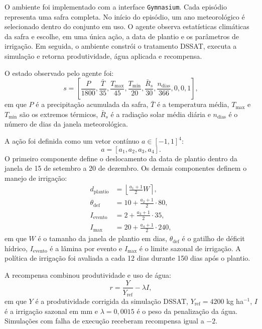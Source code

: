 O ambiente foi implementado com a interface \texttt{Gymnasium}. Cada episódio
representa uma safra completa. No início do episódio, um ano meteorológico é
selecionado dentro do conjunto em uso. O agente observa estatísticas climáticas
da safra e escolhe, em uma única ação, a data de plantio e os parâmetros de
irrigação. Em seguida, o ambiente constrói o tratamento DSSAT, executa a
simulação e retorna produtividade, água aplicada e recompensa.

O estado observado pelo agente foi:
\begin{equation}
    s =
    \left[
    \frac{P}{1800},
    \frac{\bar{T}}{35},
    \frac{T_{\max}}{45},
    \frac{T_{\min}}{20},
    \frac{\bar{R}_{s}}{30},
    \frac{n_{\mathrm{dias}}}{366},
    0,
    0,
    1
    \right],
\end{equation}
em que $P$ é a precipitação acumulada da safra, $\bar{T}$ é a temperatura média,
$T_{\max}$ e $T_{\min}$ são os extremos térmicos, $\bar{R}_{s}$ é a radiação
solar média diária e $n_{\mathrm{dias}}$ é o número de dias da janela
meteorológica.

A ação foi definida como um vetor contínuo $a \in [-1,1]^4$:
\begin{equation}
    a = [a_1, a_2, a_3, a_4].
\end{equation}
O primeiro componente define o deslocamento da data de plantio dentro da janela
de 15 de setembro a 20 de dezembro. Os demais componentes definem o manejo de
irrigação:
\begin{align}
    d_{\mathrm{plantio}} &=
    \left\lfloor
    \frac{a_1 + 1}{2} W
    \right\rceil, \\
    \theta_{\mathrm{def}} &=
    10 + \frac{a_2 + 1}{2}\cdot 80, \\
    I_{\mathrm{evento}} &=
    2 + \frac{a_3 + 1}{2}\cdot 35, \\
    I_{\mathrm{max}} &=
    20 + \frac{a_4 + 1}{2}\cdot 240,
\end{align}
em que $W$ é o tamanho da janela de plantio em dias,
$\theta_{\mathrm{def}}$ é o gatilho de déficit hídrico, $I_{\mathrm{evento}}$ é a
lâmina por evento e $I_{\mathrm{max}}$ é o limite sazonal de irrigação. A
política de irrigação foi avaliada a cada 12 dias durante 150 dias após o
plantio.

A recompensa combinou produtividade e uso de água:
\begin{equation}
    r =
    \frac{Y}{Y_{\mathrm{ref}}}
    -
    \lambda I,
\end{equation}
em que $Y$ é a produtividade corrigida da simulação DSSAT, $Y_{\mathrm{ref}} =
4200$ kg ha$^{-1}$, $I$ é a irrigação sazonal em mm e $\lambda = 0{,}0015$ é o
peso da penalização da água. Simulações com falha de execução receberam
recompensa igual a $-2$.

